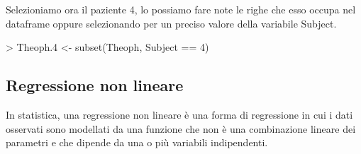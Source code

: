 \documentclass[onecolumn,11pt]{book}
\begin{document}
Selezioniamo ora il paziente 4, lo possiamo fare note le righe che esso occupa nel dataframe oppure selezionando per un preciso valore della variabile Subject.

\begin{Schunk}
\begin{Sinput}
> Theoph.4 <- subset(Theoph, Subject == 4)
\end{Sinput}
\end{Schunk}
\subsection{Regressione non lineare}
In statistica, una regressione non lineare \`e una forma di regressione in cui i dati osservati sono modellati da una funzione che non \`e una combinazione lineare dei parametri e che dipende da una o pi\`u  variabili indipendenti.  
\end{document}
